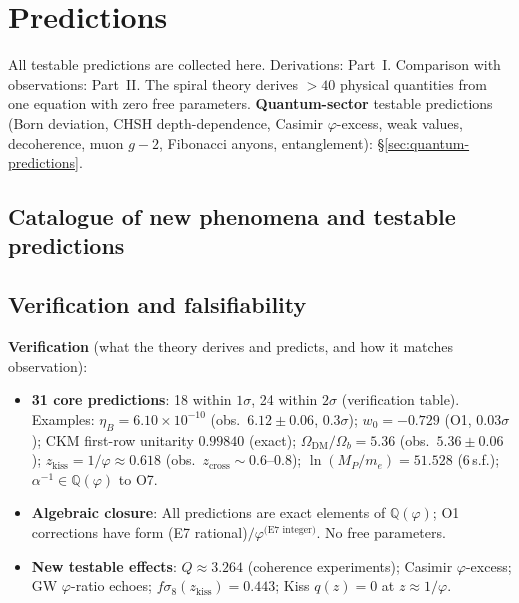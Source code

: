 \documentclass[12pt,a4paper]{article}
\begin{document}
\section{Predictions}
\label{sec:predictions}
\label{sec:verification-domain}
\label{sec:trunk-predictions}



\noindent All testable predictions are collected here. Derivations: Part~I. Comparison with observations: Part~II. The spiral theory derives $>40$ physical quantities from one equation with zero free parameters. \textbf{Quantum-sector} testable predictions (Born deviation, CHSH depth-dependence, Casimir $\varphi$-excess, weak values, decoherence, muon $g{-}2$, Fibonacci anyons, entanglement): \S\ref{sec:quantum-predictions}.

\subsection{Catalogue of new phenomena and testable predictions}
\label{sec:new-physics-catalogue}



\subsection{Verification and falsifiability}
\label{sec:verification-falsifiability}

\textbf{Verification} (what the theory derives and predicts, and how it matches observation):

\begin{itemize}[nosep,leftmargin=*]
\item \textbf{31 core predictions}: 18 within $1\sigma$, 24 within $2\sigma$ (verification table). Examples: $\eta_B = 6.10 \times 10^{-10}$ (obs.\ $6.12 \pm 0.06$, $0.3\sigma$); $w_0 = -0.729$ (O1, $0.03\sigma$); CKM first-row unitarity $0.99840$ (exact); $\Omega_{\mathrm{DM}}/\Omega_b = 5.36$ (obs.\ $5.36 \pm 0.06$); $z_{\mathrm{kiss}} = 1/\varphi \approx 0.618$ (obs.\ $z_{\mathrm{cross}} \sim 0.6$--$0.8$); $\ln(M_P/m_e) = 51.528$ (6\,s.f.); $\alpha^{-1} \in \mathbb{Q}(\varphi)$ to O7.
\item \textbf{Algebraic closure}: All predictions are exact elements of $\mathbb{Q}(\varphi)$; O1 corrections have form (E7 rational)$/\varphi^{\text{(E7 integer)}}$. No free parameters.
\item \textbf{New testable effects}: $Q \approx 3.264$ (coherence experiments); Casimir $\varphi$-excess; GW $\varphi$-ratio echoes; $f\sigma_8(z_{\mathrm{kiss}}) = 0.443$; Kiss $q(z){=}0$ at $z \approx 1/\varphi$.
\end{itemize}
\end{document}
